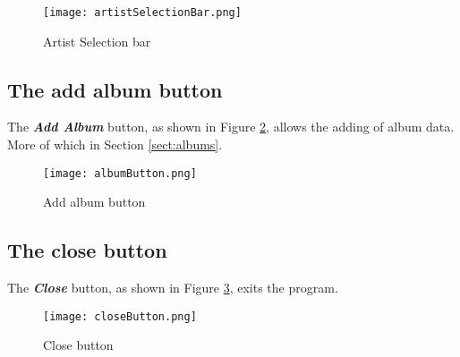\begin{figure}
\texttt{[image: artistSelectionBar.png]}
\caption{Artist Selection bar}
\label{fig:artistselectionbar}
\end{figure}

\subsection{The add album button}
The \textbf{\textit{Add Album}} button, as shown in Figure \ref{fig:addalbumbutton}, allows the adding of album data.  More of which in Section \ref{sect:albums}.

\begin{figure}
\texttt{[image: albumButton.png]}
\caption{Add album button}
\label{fig:addalbumbutton}
\end{figure}

\subsection{The close button}
The \textbf{\textit{Close}} button, as shown in Figure \ref{fig:closebutton}, exits the program.

\begin{figure}
\texttt{[image: closeButton.png]}
\caption{Close button}
\label{fig:closebutton}
\end{figure}